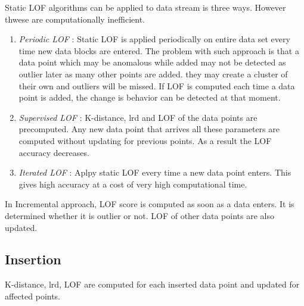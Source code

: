Static LOF algorithms can be applied to data stream is three ways. However thwese are computationally inefficient.

\begin{enumerate}
	\item \textit{Periodic LOF} : Static LOF is applied periodically on entire data set every time new data blocks are entered. The problem with such approach is that a data point which may be anomalous while added may not be detected as outlier later as many other points are added. they may create a cluster of their own and outliers will be missed. If LOF is computed each time a data point is added, the change is behavior can be detected at that moment.
	
	\item \textit{Supervised LOF} : K-distance, lrd and LOF of the data points are precomputed. Any new data point that arrives all these parameters are computed without updating for previous points. As a result the LOF accuracy decreases. 
	
	\item \textit{Iterated LOF} : Aplpy static LOF every time a new data point enters. This gives high accuracy at a cost of very high computational time. 
	
	
\end{enumerate} 

In Incremental approach, LOF score is computed as soon as a data enters. It is determined whether it is outlier or not. LOF of other data points are also updated. 

\subsection{Insertion}

K-distance, lrd, LOF are computed for each inserted data point and updated for affected points. 

